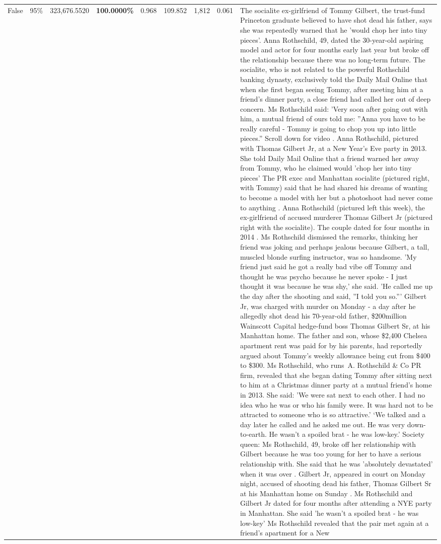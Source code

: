 \begin{table}[H]
\begin{tabular}{lllrlllll}
False & 95\% & 323,676.5520 & \bfseries \color{red} 100.0000\% & 0.968 & 109.852 & 1,812 & 0.061 & The socialite ex-girlfriend of Tommy Gilbert, the trust-fund Princeton graduate believed to have shot dead his father, says she was repeatedly warned that he 'would chop her into tiny pieces'. Anna Rothschild, 49, dated the 30-year-old aspiring model and actor for four months early last year but broke off the relationship because there was no long-term future. The socialite, who is not related to the powerful Rothschild banking dynasty, exclusively told the Daily Mail Online that when she first began seeing Tommy, after meeting him at a friend's dinner party, a close friend had called her out of deep concern. Ms Rothschild said: 'Very soon after going out with him, a mutual friend of ours told me: ''Anna you have to be really careful - Tommy is going to chop you up into little pieces.'' Scroll down for video . Anna Rothschild, pictured with Thomas Gilbert Jr, at a New Year's Eve party in 2013. She told Daily Mail Online that a friend warned her away from Tommy, who he claimed would 'chop her into tiny pieces' The PR exec and Manhattan socialite (pictured right, with Tommy) said that he had shared his dreams of wanting to become a model with her but a photoshoot had never come to anything . Anna Rothschild (pictured left this week), the ex-girlfriend of accused murderer Thomas Gilbert Jr (pictured right with the socialite). The couple dated for four months in 2014 . Ms Rothschild dismissed the remarks, thinking her friend was joking and perhaps jealous because Gilbert, a tall, muscled blonde surfing instructor, was so handsome. 'My friend just said he got a really bad vibe off Tommy and thought he was psycho because he never spoke - I just thought it was because he was shy,' she said. 'He called me up the day after the shooting and said, ''I told you so.''' Gilbert Jr, was charged with murder on Monday - a day after he allegedly shot dead his 70-year-old father, \$200million Wainscott Capital hedge-fund boss Thomas Gilbert Sr, at his Manhattan home. The father and son, whose \$2,400 Chelsea apartment rent was paid for by his parents, had reportedly argued about Tommy's weekly allowance being cut from \$400 to \$300. Ms Rothschild, who runs A. Rothschild \& Co PR firm, revealed that she began dating Tommy after sitting next to him at a Christmas dinner party at a mutual friend's home in 2013. She said: 'We were sat next to each other. I had no idea who he was or who his family were. It was hard not to be attracted to someone who is so attractive.' ‘We talked and a day later he called and he asked me out. He was very down-to-earth. He wasn’t a spoiled brat - he was low-key.’ Society queen: Ms Rothschild, 49, broke off her relationship with Gilbert because he was too young for her to have a serious relationship with. She said that he was 'absolutely devastated' when it was over . Gilbert Jr, appeared in court on Monday night, accused of shooting dead his father, Thomas Gilbert Sr at his Manhattan home on Sunday . Ms Rothschild and Gilbert Jr dated for four months after attending a NYE party in Manhattan. She said 'he wasn't a spoiled brat - he was low-key' Ms Rothschild revealed that the pair met again at a friend’s apartment for a New 
\end{tabular}
\end{table}
